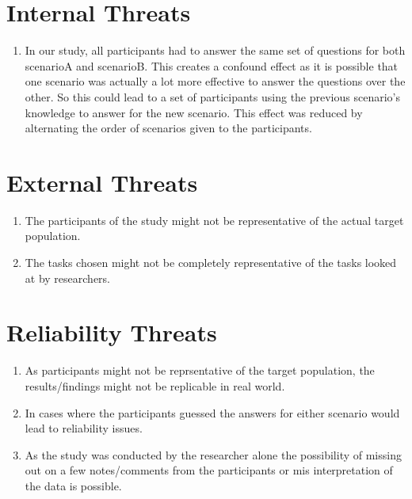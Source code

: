 \documentclass[seploa]{beavtex}
\begin{document}
\section{Internal Threats}
\begin{enumerate}
\item In our study, all participants had to answer the same set of questions for both scenarioA and scenarioB. This creates a confound effect as it is possible that one scenario was actually a lot more effective to answer the questions over the other. So this could lead to a set of participants using the previous scenario's knowledge to answer for the new scenario. This effect was reduced by alternating the order of scenarios given to the participants.
\end{enumerate}

\section{External Threats}
\begin{enumerate}
\item The participants of the study might not be representative of the actual target population.
\item The tasks chosen might not be completely representative of the tasks looked at by researchers.
\end{enumerate}

\section{Reliability Threats}
\begin{enumerate}
\item As participants might not be reprsentative of the target population, the results/findings might not be replicable in real world.
\item In cases where the participants guessed the answers for either scenario would lead to reliability issues.
\item As the study was conducted by the researcher alone the possibility of missing out on a few notes/comments from the participants or mis interpretation of the data is possible.
\end{enumerate}
\end{document}
